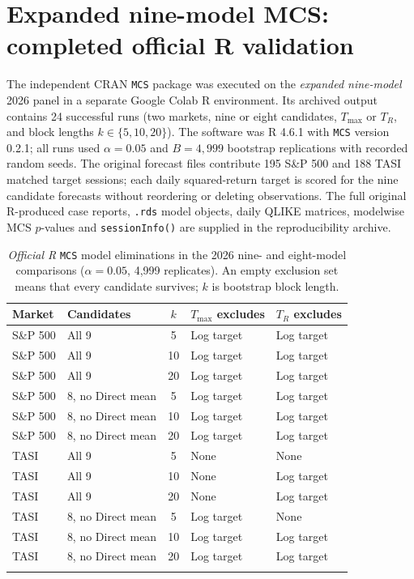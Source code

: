 \section{Expanded nine-model MCS: completed official R validation}\label{sec:expanded_mcs}
The independent CRAN \texttt{MCS} package was executed on the \emph{expanded nine-model} 2026 panel in a separate Google Colab R environment. Its archived output contains 24 successful runs (two markets, nine or eight candidates, $T_{\max}$ or $T_R$, and block lengths $k\in\{5,10,20\}$). The software was R 4.6.1 with \texttt{MCS} version 0.2.1; all runs used $\alpha=0.05$ and $B=4{,}999$ bootstrap replications with recorded random seeds. The original forecast files contribute 195 S\&P 500 and 188 TASI matched target sessions; each daily squared-return target is scored for the nine candidate forecasts without reordering or deleting observations. The full original R-produced case reports, \texttt{.rds} model objects, daily QLIKE matrices, modelwise MCS $p$-values and \texttt{sessionInfo()} are supplied in the reproducibility archive.

\begin{table}[htbp]
\centering\footnotesize
\caption{\emph{Official R} \texttt{MCS} model eliminations in the 2026 nine- and eight-model comparisons ($\alpha=0.05$, 4,999 replicates). An empty exclusion set means that every candidate survives; $k$ is bootstrap block length.}\label{tab:official_R_nine}
\begin{tabular}{@{}llcll@{}}\toprule
Market & Candidates & $k$ & $T_{\max}$ excludes & $T_R$ excludes\\\midrule
S\&P 500 & All 9 & 5 & Log target & Log target \\
S\&P 500 & All 9 & 10 & Log target & Log target \\
S\&P 500 & All 9 & 20 & Log target & Log target \\
\addlinespace[2pt]
S\&P 500 & 8, no Direct mean & 5 & Log target & Log target \\
S\&P 500 & 8, no Direct mean & 10 & Log target & Log target \\
S\&P 500 & 8, no Direct mean & 20 & Log target & Log target \\
\addlinespace[2pt]
TASI & All 9 & 5 & None & None \\
TASI & All 9 & 10 & None & Log target \\
TASI & All 9 & 20 & None & Log target \\
\addlinespace[2pt]
TASI & 8, no Direct mean & 5 & Log target & None \\
TASI & 8, no Direct mean & 10 & Log target & Log target \\
TASI & 8, no Direct mean & 20 & Log target & Log target \\
\addlinespace[2pt]
\bottomrule\end{tabular}
\end{table}
\FloatBarrier

